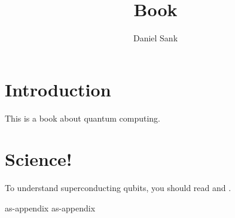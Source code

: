 \documentclass{book}
\author{Daniel Sank}
\title{Book}
\begin{document}
\maketitle

\tableofcontents

\chapter{Introduction}

This is a book about quantum computing.

\chapter{Science!}

To understand superconducting qubits, you should read \mycitetype {} and \mycitetype {}.

\begin{appendix}
{as-appendix}
{as-appendix}
\end{appendix}
\end{document}
